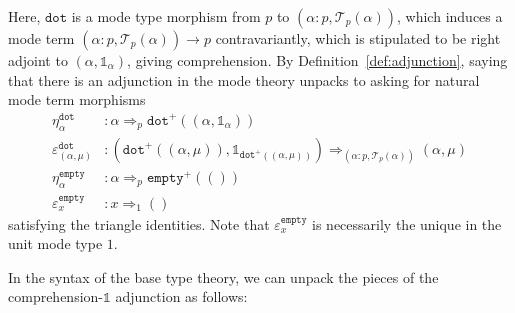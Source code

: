 \documentclass[10pt]{article}
\theoremstyle{definition}
\newcommand{\tcell}{\Rightarrow}
\newcommand{\sigmacl}[3]{\ensuremath{(#1{:}#2,#3)}}
\newcommand\TrPlus[2]{\ensuremath{{#1}^+(#2)}}
\newcommand\El[2]{\mathcal{T}_{#1}(#2)}
\newcommand{\tdot}{\ensuremath{\mathtt{dot}}}
\newcommand{\tempty}{\ensuremath{\mathtt{empty}}}
\newcommand\One{\ensuremath{\mathds{1}}}
\begin{document}
Here, $\tdot$ is a mode type morphism from $p$ to
${\sigmacl{\alpha}{p}{\El{p}{\alpha}}}$, which induces a mode term
${\sigmacl{\alpha}{p}{\El{p}{\alpha}}} \to p$ contravariantly, which is
stipulated to be right adjoint to $(\alpha,\One_\alpha)$, giving
comprehension.  By Definition~\ref{def:adjunction}, saying that there is
an adjunction in the mode theory unpacks to asking for natural mode term
morphisms
\begin{align*}
\eta^\tdot_\alpha {}&: \alpha \tcell_p \TrPlus{\tdot}{(\alpha, \One_\alpha)} \\
\varepsilon^\tdot_{(\alpha, \mu)} {}&: (\TrPlus{\tdot}{(\alpha, \mu)}, \One_{\TrPlus{\tdot}{(\alpha, \mu)}}) \tcell_{\sigmacl{\alpha}{p}{\El{p}{\alpha}}} (\alpha, \mu) \\
\eta^\tempty_\alpha {}&: \alpha \tcell_p \TrPlus{\tempty}{()} \\
\varepsilon^\tempty_{x} {}&: x \tcell_1 ()
\end{align*}
satisfying the triangle identities.  Note that $\varepsilon^\tempty_x$
is necessarily the unique in the unit mode type $1$.

In the syntax of the base type theory, we can unpack the pieces of the
comprehension-$\One$ adjunction as follows:
\end{document}
